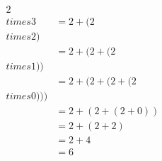 \documentclass[preview]{standalone}
\begin{document}
\begin{align*}
2 \\times 3 &= 2 + (2 \\times 2) \\ &= 2 + (2 + (2 \\times 1)) \\ &= 2 + (2 + (2 + (2 \\times 0))) \\ &= 2 + (2 + (2 + 0)) \\ &= 2 + (2 + 2) \\ &= 2 + 4 \\ &= 6
\end{align*}
\end{document}
